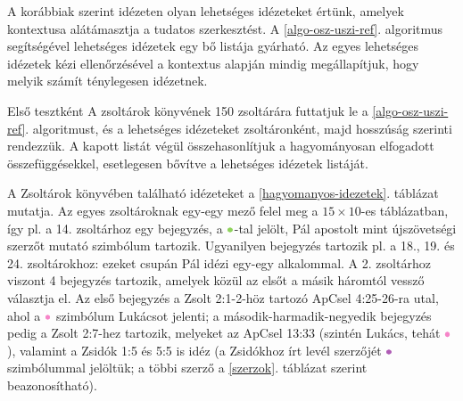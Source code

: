 \documentclass{article}
\newcommand\Luke{{\color{Lavender}\bullet}\mathllap{\color{Lavender}\circ}}
\newcommand\Paul{{\color{YellowGreen}\bullet}\mathllap{\color{YellowGreen}\circ}}
\newcommand\Unknown{{\color{Orchid}\bullet}\mathllap{\color{Orchid}\circ}}
\begin{document}

A korábbiak szerint idézeten olyan lehetséges idézeteket értünk,
amelyek kontextusa alátámasztja a tudatos szerkesztést.
A \ref{algo-osz-uszi-ref}. algoritmus segítségével lehetséges idézetek egy bő listája gyárható.
Az egyes lehetséges idézetek kézi ellenőrzésével a kontextus alapján mindig megállapítjuk,
hogy melyik számít ténylegesen idézetnek.

Első tesztként A zsoltárok könyvének 150 zsoltárára futtatjuk le a \ref{algo-osz-uszi-ref}. algoritmust,
és a lehetséges idézeteket zsoltáronként, majd hosszúság szerinti rendezzük.
A kapott listát végül összehasonlítjuk a hagyományosan elfogadott összefüggésekkel,
esetlegesen bővítve a lehetséges idézetek listáját.

A Zsoltárok könyvében található idézeteket a \ref{hagyomanyos-idezetek}. táblázat mutatja. Az
egyes zsoltároknak egy-egy mező felel meg a $15\times10$-es táblázatban, így pl. a 14. zsoltárhoz
egy bejegyzés, a $\Paul$-tal jelölt, Pál apostolt mint újszövetségi szerzőt mutató szimbólum tartozik.
Ugyanilyen bejegyzés tartozik pl. a 18., 19. és 24. zsoltárokhoz: ezeket csupán Pál idézi egy-egy
alkalommal. A 2. zsoltárhoz viszont 4 bejegyzés tartozik, amelyek közül az elsőt a másik háromtól
vessző választja el. Az első bejegyzés a Zsolt 2:1-2-höz tartozó ApCsel 4:25-26-ra utal, ahol
a $\Luke$ szimbólum Lukácsot jelenti; a második-harmadik-negyedik bejegyzés pedig a Zsolt 2:7-hez
tartozik, melyeket az ApCsel 13:33 (szintén Lukács, tehát $\Luke$), valamint a Zsidók 1:5 és 5:5 is
idéz (a Zsidókhoz írt levél szerzőjét $\Unknown$ szimbólummal jelöltük; a többi szerző
a \ref{szerzok}. táblázat szerint beazonosítható).
\end{document}
